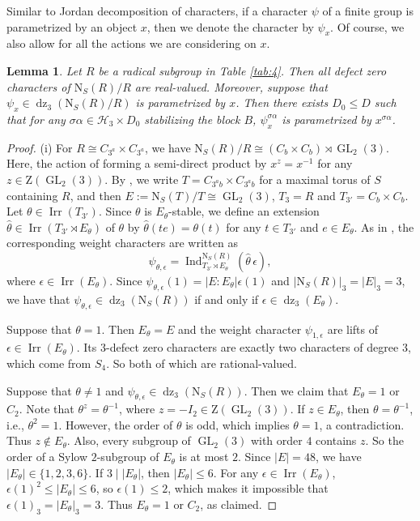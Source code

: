 \documentclass[11pt,a4paper]{article}
\numberwithin{equation}{section}
\newtheorem{lemma}[theorem]{Lemma}
\theoremstyle{definition}
\theoremstyle{remark}
\newcommand{\Irr}{\operatorname{Irr}}
\newcommand{\GL}{\operatorname{GL}}
\newcommand{\dz}{\operatorname{dz}}
\newcommand{\ZZ}{\mathrm{Z}}
\newcommand{\HH}{\mathcal H}
\newcommand{\NN}{\mathrm N}
\newcommand{\Ind}{\operatorname{Ind}}
\begin{document}
Similar to Jordan decomposition of characters, if a character $\psi$ of a finite group is parametrized by an object $x$, then we denote the character by \(\psi_x\). Of course, we also allow for all the actions we are considering on $x$.

\begin{lemma}\label{lem:3.20}
Let $R$ be a radical subgroup in  Table \ref{tab:4}.
Then all defect zero characters of $\NN_S(R)/R$  are real-valued. Moreover, suppose that  $\psi_x\in\dz_3(\NN_S(R)/R)$ is parametrized by $x$. Then there exists $D_0\leq D$ such that for any $\sigma\alpha\in \HH_3\times D_0$ stabilizing the block $B$, $\psi_x^{\sigma\alpha}$ is parametrized by $x^{\sigma\alpha}$.
\end{lemma}
\begin{proof}
(i) For $R\cong C_{3^a}\times C_{3^a}$, we have $\NN_S(R)/R\cong (C_{b}\times C_{b})\rtimes\GL_2(3)$. Here, the action of 
forming a semi-direct product by $x^z=x^{-1}$ for any 
$z\in \ZZ(\GL_2(3))$. By \cite[TABLE I]{An}, we write $T=C_{3^ab}\times C_{3^ab}$ for a maximal torus of $S$ containing $R$, and then $E:=\NN_S(T)/T\cong \GL_2(3)$, $T_{3}=R$ and $T_{3'}=C_{b}\times C_{b}$.
Let $\theta\in\Irr(T_{3'})$. Since $\theta$ is $E_\theta$-stable, we define an extension $\widehat \theta\in\Irr(T_{3'}\rtimes E_\theta)$ of $\theta$ by $\widehat \theta(te)=\theta(t)$ for any $t\in T_{3'}$ and $e\in E_\theta$. As in \cite[Sections 3 and 5]{Malle}, the corresponding weight characters are written as
\begin{equation}
\psi_{\theta,\epsilon}
= \Ind_{T_{3'}\rtimes E_\theta}^{\NN_{S}(R)}
(\widehat\theta\,\epsilon),    
\end{equation}
where $\epsilon\in\Irr(E_\theta)$. Since
$\psi_{\theta,\epsilon}(1)=|E:E_\theta|\epsilon(1)$ and
$|\NN_S(R)|_3=|E|_3=3$, we have that $\psi_{\theta,\epsilon}\in\dz_3(\NN_S(R))$ if and only if
$\epsilon\in\dz_3(E_\theta)$. 

Suppose that $\theta=1$. Then $E_\theta=E$ and the weight character $\psi_{1, \epsilon}$ are lifts of $\epsilon\in\Irr(E_\theta)$. Its $3$-defect zero characters are exactly two characters of degree $3$, which come from $S_4$. So both of which are rational-valued.

Suppose that $\theta\neq 1$ and $\psi_{\theta,\epsilon}\in\dz_3(\NN_S(R))$. Then we claim that $E_\theta=1$ or $C_2$. Note that $\theta^z=\theta^{-1}$, where $z=-I_2\in\ZZ(\GL_2(3))$.
If \(z\in E_\theta\), then 
\(\theta=\theta^{-1}\), i.e., \(\theta^2=1\). However, the order of \(\theta\) is odd, which implies \(\theta=1\), a contradiction. Thus $z\notin E_\theta$.
Also, every subgroup of \(\GL_2(3)\) with order $4$ contains 
\(z\). So the order of a Sylow \(2\)-subgroup of \(E_\theta\) is at most \(2\). Since \(|E|=48\), we have
$|E_\theta|\in\{1,2,3,6\}$. If \(3\mid|E_\theta|\), then 
\(|E_\theta|\le6\). For any \(\epsilon\in\Irr(E_\theta)\),
$\epsilon(1)^2\le|E_\theta|\le6$, so \(\epsilon(1)\le2\), which makes it impossible that $\epsilon(1)_3=|E_\theta|_3=3$. Thus $E_\theta=1$ or $C_2$, as claimed.


\end{proof}
\end{document}
